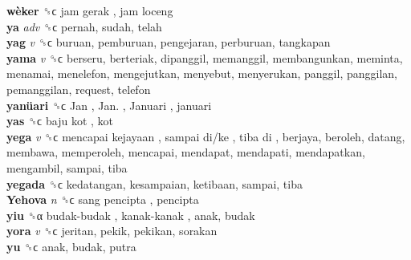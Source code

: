 \textbf{wèker} ␝ϲ   jam gerak ,  jam loceng   \\
\textbf{ya} \emph{adv}  ␝ϲ  pernah, sudah, telah  \\
\textbf{yag} \emph{v}  ␝ϲ  buruan, pemburuan, pengejaran, perburuan, tangkapan  \\
\textbf{yama} \emph{v}  ␝ϲ  berseru, berteriak, dipanggil, memanggil, membangunkan, meminta, menamai, menelefon, mengejutkan, menyebut, menyerukan, panggil, panggilan, pemanggilan, request, telefon  \\
\textbf{yanüari} ␝ϲ   Jan ,  Jan. ,  Januari , januari  \\
\textbf{yas} ␝ϲ   baju kot , kot  \\
\textbf{yega} \emph{v}  ␝ϲ   mencapai kejayaan ,  sampai di/ke ,  tiba di , berjaya, beroleh, datang, membawa, memperoleh, mencapai, mendapat, mendapati, mendapatkan, mengambil, sampai, tiba  \\
\textbf{yegada} ␝ϲ  kedatangan, kesampaian, ketibaan, sampai, tiba  \\
\textbf{Yehova} \emph{n}  ␝ϲ   sang pencipta , pencipta  \\
\textbf{yiu} ␝α   budak-budak ,  kanak-kanak , anak, budak  \\
\textbf{yora} \emph{v}  ␝ϲ  jeritan, pekik, pekikan, sorakan  \\
\textbf{yu} ␝ϲ  anak, budak, putra  \\
